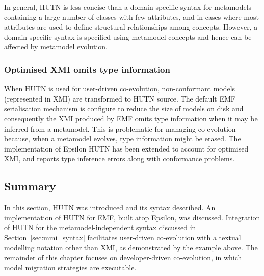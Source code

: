 In general, HUTN is less concise than a domain-specific syntax for metamodels containing a large number of classes with few attributes, and in cases where most attributes are used to define structural relationships among concepts. However, a domain-specific syntax is specified using metamodel concepts and hence can be affected by metamodel evolution.

\subsubsection{Optimised XMI omits type information}
When HUTN is used for user-driven co-evolution, non-conformant models (represented in XMI) are transformed to HUTN source. The default EMF serialisation mechanism is configure to reduce the size of models on disk and consequently the XMI produced by EMF omits type information when it may be inferred from a metamodel. This is problematic for managing co-evolution because, when a metamodel evolves, type information might be erased. The implementation of Epsilon HUTN has been extended to account for optimised XMI, and reports type inference errors along with conformance problems. 

\subsection{Summary}
In this section, HUTN was introduced and its syntax described. An implementation of HUTN for EMF, built atop Epsilon, was discussed. Integration of HUTN for the metamodel-independent syntax discussed in Section~\ref{sec:mmi_syntax} facilitates user-driven co-evolution with a textual modelling notation other than XMI, as demonstrated by the example above. The remainder of this chapter focuses on developer-driven co-evolution, in which model migration strategies are executable.